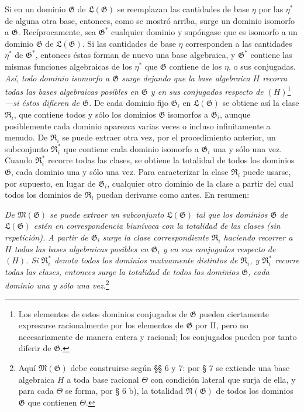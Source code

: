 Si en un dominio $\mathfrak G$ de $\mathfrak L(\mathfrak G)$ se reemplazan las cantidades de base $\eta$ por las $\eta^*$ de alguna otra base, entonces, como se mostró arriba, surge un dominio isomorfo a $\mathfrak G$. Recíprocamente, sea $\mathfrak G^*$ cualquier dominio y supóngase que es isomorfo a un dominio $\mathfrak G$ de $\mathfrak L(\mathfrak G)$. Si las cantidades de base $\eta$ corresponden a las cantidades $\eta^*$ de $\mathfrak G^*$, entonces éstas forman de nuevo una base algebraica, y $\mathfrak G^*$ contiene las mismas funciones algebraicas de los $\eta^*$ que $\mathfrak G$ contiene de los $\eta$, o sus conjugadas. \emph{Así, todo dominio isomorfo a $\mathfrak G$ surge dejando que la base algebraica $H$ recorra todas las bases algebraicas posibles en $\mathfrak G$ y en sus conjugados respecto de $(H)$}\footnote{Los elementos de estos dominios conjugados de $\mathfrak G$ pueden ciertamente expresarse racionalmente por los elementos de $\mathfrak G$ por II, pero no necesariamente de manera entera y racional; los conjugados pueden por tanto diferir de $\mathfrak G$.} \emph{---si éstos difieren de $\mathfrak G$.} De cada dominio fijo $\mathfrak G_i$ en $\mathfrak L(\mathfrak G)$ se obtiene así la clase $\mathfrak R_i$, que contiene todos y sólo los dominios $\mathfrak G$ isomorfos a $\mathfrak G_i$, aunque posiblemente cada dominio aparezca varias veces o incluso infinitamente a menudo. De $\mathfrak R_i$ se puede extraer otra vez, por el procedimiento anterior, un subconjunto $\mathfrak R_i^*$ que contiene cada dominio isomorfo a $\mathfrak G_i$ una y sólo una vez. Cuando $\mathfrak R_i^*$ recorre todas las clases, se obtiene la totalidad de todos los dominios $\mathfrak G$, cada dominio una y sólo una vez. Para caracterizar la clase $\mathfrak R_i$ puede usarse, por supuesto, en lugar de $\mathfrak G_i$, cualquier otro dominio de la clase a partir del cual todos los dominios de $\mathfrak R_i$ puedan derivarse como antes. En resumen:

\emph{De $\mathfrak M(\mathfrak G)$ se puede extraer un subconjunto $\mathfrak L(\mathfrak G)$ tal que los dominios $\mathfrak G$ de $\mathfrak L(\mathfrak G)$ estén en correspondencia biunívoca con la totalidad de las clases (sin repetición). A partir de $\mathfrak G_i$ surge la clase correspondiente $\mathfrak R_i$ haciendo recorrer a $H$ todas las bases algebraicas posibles en $\mathfrak G_i$ y en sus conjugados respecto de $(H)$. Si $\mathfrak R_i^*$ denota todos los dominios mutuamente distintos de $\mathfrak R_i$, y $\mathfrak R_i^*$ recorre todas las clases, entonces surge la totalidad de todos los dominios $\mathfrak G$, cada dominio una y sólo una vez.}\footnote{Aquí $\mathfrak M(\mathfrak G)$ debe construirse según §§ 6 y 7: por § 7 se extiende una base algebraica $H$ a toda base racional $\Theta$ con condición lateral que surja de ella, y para cada $\Theta$ se forma, por § 6 b), la totalidad $\mathfrak N(\mathfrak G)$ de todos los dominios $\mathfrak G$ que contienen $\Theta$.}


